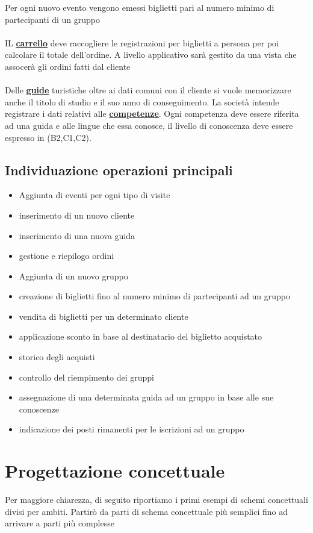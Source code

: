 \documentclass[a4paper,12pt]{report}
\begin{document}
Per ogni nuovo evento vengono emessi biglietti pari al numero minimo di partecipanti di un gruppo\\\\
IL \textbf{\underline{carrello}} deve raccogliere le registrazioni per biglietti a persona per poi calcolare
il totale dell'ordine. A livello applicativo sarà gestito da una vista che assocerà gli ordini fatti dal cliente \\\\
Delle \textbf{\underline{guide}} turistiche oltre ai dati comuni con il cliente si vuole memorizzare
anche il titolo di studio e il suo anno di conseguimento. La società intende registrare i dati relativi
alle \textbf{\underline{competenze}}. Ogni competenza deve essere riferita ad una guida e alle lingue che essa conosce,
il livello di conoscenza deve essere espresso in (B2,C1,C2).

\section*{Individuazione operazioni principali}
\begin{itemize}
	\item Aggiunta di eventi per ogni tipo di visite
	\item inserimento di un nuovo cliente
	\item inserimento di una nuova guida
	\item gestione e riepilogo ordini
	\item Aggiunta di un nuovo gruppo
	\item creazione di biglietti fino al numero minimo di partecipanti ad un gruppo
	\item vendita di biglietti per un determinato cliente
	\item applicazione sconto in base al destinatario del biglietto acquistato
	\item storico degli acquisti
	\item controllo del riempimento dei gruppi
	\item assegnazione di una determinata guida ad un gruppo in base alle sue conoscenze
	\item indicazione dei posti rimanenti per le iscrizioni ad un gruppo
\end{itemize}

\newpage
\chapter{Progettazione concettuale}
Per maggiore chiarezza, di seguito riportiamo i primi esempi di schemi concettuali
divisi per ambiti. Partirò da parti di schema concettuale più semplici fino ad arrivare a parti più complesse
\end{document}
